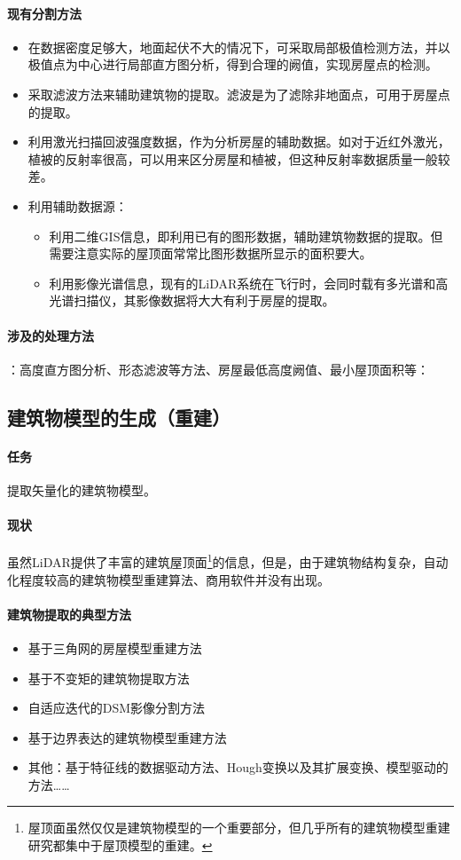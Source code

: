 \paragraph{现有分割方法}
\begin{itemize}
	\item 在数据密度足够大，地面起伏不大的情况下，可采取局部极值检测方法，并以极值点为中心进行局部直方图分析，得到合理的阙值，实现房屋点的检测。
	\item 采取滤波方法来辅助建筑物的提取。滤波是为了滤除非地面点，可用于房屋点的提取。
	\item 利用激光扫描回波强度数据，作为分析房屋的辅助数据。如对于近红外激光，植被的反射率很高，可以用来区分房屋和植被，但这种反射率数据质量一般较差。
	\item 利用辅助数据源：
		\begin{itemize}
			\item 利用二维GIS信息，即利用已有的图形数据，辅助建筑物数据的提取。但需要注意实际的屋顶面常常比图形数据所显示的面积要大。
			\item 利用影像光谱信息，现有的LiDAR系统在飞行时，会同时载有多光谱和高光谱扫描仪，其影像数据将大大有利于房屋的提取。
		\end{itemize}
\end{itemize}

\paragraph{涉及的处理方法}：高度直方图分析、形态滤波等方法、房屋最低高度阙值、最小屋顶面积等：

\subsection{建筑物模型的生成（重建）}
\paragraph{任务}提取矢量化的建筑物模型。

\paragraph{现状}虽然LiDAR提供了丰富的建筑屋顶面\footnote{屋顶面虽然仅仅是建筑物模型的一个重要部分，但几乎所有的建筑物模型重建研究都集中于屋顶模型的重建。}的信息，但是，由于建筑物结构复杂，自动化程度较高的建筑物模型重建算法、商用软件并没有出现。

\paragraph{建筑物提取的典型方法}
\begin{itemize}
	\item 基于三角网的房屋模型重建方法
	\item 基于不变矩的建筑物提取方法
	\item 自适应迭代的DSM影像分割方法
	\item 基于边界表达的建筑物模型重建方法
	\item 其他：基于特征线的数据驱动方法、Hough变换以及其扩展变换、模型驱动的方法……
\end{itemize}

